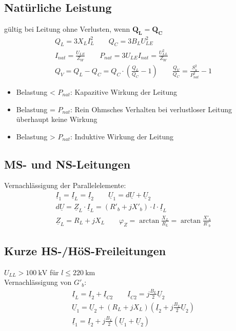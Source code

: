 \subsection{Natürliche Leistung}
    gültig bei Leitung ohne Verlusten, wenn \(\mathbf{Q_L = Q_C}\)
    \begin{gather*}
        Q_L = 3 X_L I_L^2 \qquad Q_C = 3 B_L U_{LE}^2 \\
        I_{nat} = \frac{U_{LE}}{Z_W} \qquad P_{nat} = 3 U_{LE} I_{nat} = \frac{U_{LL}^2}{Z_W} \\
        Q_V = Q_L - Q_C = Q_C \cdot \left( \frac{Q_L}{Q_C} - 1 \right) \qquad \frac{Q_V}{Q_C} = \frac{S_{\ddot{u}}^2}{P_{nat}^2} - 1
    \end{gather*}
    \begin{itemize}
        \item Belastung < \(P_{nat}\): Kapazitive Wirkung der Leitung
        \item Belastung = \(P_{nat}\): Rein Ohmsches Verhalten \textrightarrow bei verlustloser Leitung überhaupt keine Wirkung
        \item Belastung > \(P_{nat}\): Induktive Wirkung der Leitung
    \end{itemize}

\subsection{MS- und NS-Leitungen}
    Vernachlässigung der Parallelelemente:
    \begin{gather*}
        \underline{I}_1 = \underline{I}_L = \underline{I}_2 \qquad \underline{U}_1 = d \underline{U} + \underline{U}_2 \\
        d \underline{U} = \underline{Z}_L \cdot \underline{I}_L = (R'_b + jX'_b) \cdot l \cdot \underline{I}_L \\
        \underline{Z}_L = R_L + jX_L \qquad \varphi_Z = \arctan \frac{X_L}{R_L} = \arctan \frac{X'_b}{R'_b} 
    \end{gather*}

\subsection{Kurze HS-/HöS-Freileitungen}
    \(U_{LL} > \SI{100}{\kilo\volt}\) für \(l \le \SI{220}{\kilo\meter}\) \\
    Vernachlässigung von \(G'_b\):
    \begin{gather*}
        \underline{I}_L = \underline{I}_2 + \underline{I}_{C2} \qquad \underline{I}_{C2} = j \frac{B_L}{2} \underline{U}_2 \\
        \underline{U}_1 = \underline{U}_2 + (R_L + jX_L)(\underline{I}_2 + j\frac{B_L}{2} \underline{U}_2) \\
        \underline{I}_1 = \underline{I}_2 + j \frac{B_L}{2} (\underline{U}_1 + \underline{U}_2)
    \end{gather*}

